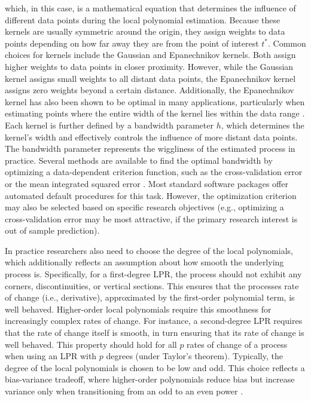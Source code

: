 \documentclass[man, floatsintext]{apa7}
\begin{document}
\noindent which, in this case, is a mathematical equation that determines the
influence of different data points during the local polynomial estimation.
Because these kernels are usually symmetric around the origin, they assign
weights to data points depending on how far away they are from the point of
interest $t^*$. Common choices for kernels include the Gaussian and
Epanechnikov kernels. Both assign higher weights to data points in closer
proximity. However, while the Gaussian kernel assigns small weights to all
distant data points, the Epanechnikov kernel assigns zero weights beyond a
certain distance. Additionally, the Epanechnikov kernel has also been shown to
be optimal in many applications, particularly when estimating points where the
entire width of the kernel lies within the data range
\parencite{fan_local_1997}. Each kernel is further defined by a bandwidth
parameter $h$, which determines the kernel's width and effectively controls the
influence of more distant data points. The bandwidth parameter represents the
wiggliness of the estimated process in practice. Several methods are available
to find the optimal bandwidth by optimizing a data-dependent criterion
function, such as the cross-validation error or the mean integrated squared
error \parencite{kohler_review_2014, debruyne_model_2008}. Most standard
software packages offer automated default procedures for this task. However,
the optimization criterion may also be selected based on specific research
objectives (e.g., optimizing a cross-validation error may be most attractive,
if the primary research interest is out of sample prediction).

In practice researchers also need to choose the degree of the local
polynomials, which additionally reflects an assumption about how smooth the
underlying process is. Specifically, for a first-degree LPR, the process should
not exhibit any corners, discontinuities, or vertical sections. This ensures
that the processes rate of change (i.e., derivative), approximated by the
first-order polynomial term, is well behaved. Higher-order local polynomials
require this smoothness for increasingly complex rates of change. For instance,
a second-degree LPR requires that the rate of change itself is smooth, in turn
ensuring that its rate of change is well behaved. This property should hold for
all $p$ rates of change of a process when using an LPR with $p$ degrees (under
Taylor's theorem). Typically, the degree of the local polynomials is chosen to
be low and odd. This choice reflects a bias-variance tradeoff, where
higher-order polynomials reduce bias but increase variance only when
transitioning from an odd to an even power
\parencite{ruppert_multivariate_1994}.
\end{document}
